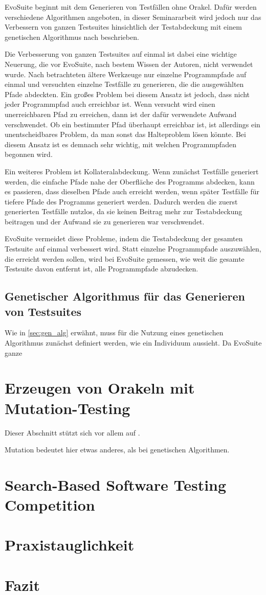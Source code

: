 \documentclass[a4paper,11pt]{article}
\begin{document}
EvoSuite beginnt mit dem Generieren von Testfällen ohne Orakel.
Dafür werden verschiedene Algorithmen angeboten, in dieser Seminararbeit wird jedoch nur das Verbessern von ganzen Testsuites hinsichtlich der Testabdeckung mit einem genetischen Algorithmus nach \cite{TSE12_EvoSuite} beschrieben.

Die Verbesserung von ganzen Testsuites auf einmal ist dabei eine wichtige Neuerung, die vor EvoSuite, nach bestem Wissen der Autoren, nicht verwendet wurde.
Nach \cite{?} betrachteten ältere Werkzeuge nur einzelne Programmpfade auf einmal und versuchten einzelne Testfälle zu generieren, die die ausgewählten Pfade abdeckten.
Ein großes Problem bei diesem Ansatz ist jedoch, dass nicht jeder Programmpfad auch erreichbar ist.
Wenn versucht wird einen unerreichbaren Pfad zu erreichen, dann ist der dafür verwendete Aufwand verschwendet.
Ob ein bestimmter Pfad überhaupt erreichbar ist, ist allerdings ein unentscheidbares Problem, da man sonst das Halteproblem lösen könnte.
Bei diesem Ansatz ist es demnach sehr wichtig, mit welchen Programmpfaden begonnen wird.

Ein weiteres Problem ist Kollateralabdeckung.
Wenn zunächst Testfälle generiert werden, die einfache Pfade nahe der Oberfläche des Programms abdecken, kann es passieren, dass dieselben Pfade auch erreicht werden, wenn später Testfälle für tiefere Pfade des Programms generiert werden.
Dadurch werden die zuerst generierten Testfälle nutzlos, da sie keinen Beitrag mehr zur Testabdeckung beitragen und der Aufwand sie zu generieren war verschwendet.

EvoSuite vermeidet diese Probleme, indem die Testabdeckung der gesamten Testsuite auf einmal verbessert wird.
Statt einzelne Programmpfade auszuwählen, die erreicht werden sollen, wird bei EvoSuite gemessen, wie weit die gesamte Testsuite davon entfernt ist, alle Programmpfade abzudecken.

\subsection{Genetischer Algorithmus für das Generieren von Testsuites}

Wie in \cref{sec:gen_alg} erwähnt, muss für die Nutzung eines genetischen Algorithmus zunächst definiert werden, wie ein Individuum aussieht.
Da EvoSuite ganze

\section{Erzeugen von Orakeln mit Mutation-Testing}

Dieser Abschnitt stützt sich vor allem auf \cite{TSE12_Mutation}.

Mutation bedeutet hier etwas anderes, als bei genetischen Algorithmen.

\section{Search-Based Software Testing Competition}

\section{Praxistauglichkeit}

\section{Fazit}



\end{document}
